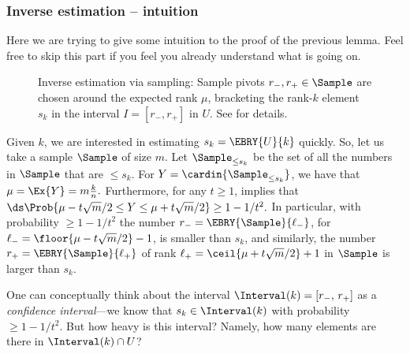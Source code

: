 \subsubsection{Inverse estimation -- intuition}

Here we are trying to give some intuition to the proof of the previous
lemma. Feel free to skip this part if you feel you already understand
what is going on.

\begin{figure}[t]
    \centering
    \caption{Inverse estimation via sampling: Sample pivots $r_-,
      r_+ \in \Sample$ are chosen around the expected rank $\mu$,
      bracketing the rank-$k$ element $s_k$ in the interval $I = [r_-,
      r_+]$ in $U$. See  for details.}
\end{figure}


Given $k$, we are interested in estimating $s_k = \EBRY{U}{k}$
quickly. So, let us take a sample $\Sample$ of size $m$. Let
$\Sample_{\leq s_k}$ be the set of all the numbers in $\Sample$ that
are $\leq s_k$. For $Y = \cardin{\Sample_{\leq s_k}}$, we have that
\begin{math}
  \mu = \Ex{Y} = m \frac{k}{n}.
\end{math}
Furthermore, for any $t\geq 1$,  implies that
\begin{math}
    \ds%
    \Prob{ \mu - t \sqrt{m}/2 \leq Y \leq \mu + t \sqrt{m}/2 } \geq 1-
    {1}/{t^2}.
\end{math}
In particular, with probability $\geq 1- 1/t^2$ the number
$r_{-} =\EBRY{\Sample}{\ell_-}$, for
$\ell_{-} = \floor{\mu - t \sqrt{m}/2 }-1$, is smaller than $s_k$, and
similarly, the number $r_{+} = \EBRY{\Sample}{\ell_{+}}$ of rank
$\ell_{+} = \ceil{\mu + t \sqrt{m}/2 }+1$ in $\Sample$ is larger than
$s_k$.

One can conceptually think about the interval
\begin{math}
    \Interval(k) = [r_-,\, r_+ ]%
\end{math}
as a \emph{confidence interval}---we know that $s_k \in \Interval(k)$
with probability $\geq 1-1/t^2$. But how heavy is this interval?  Namely,
how many elements are there in $\Interval(k) \cap U$?

